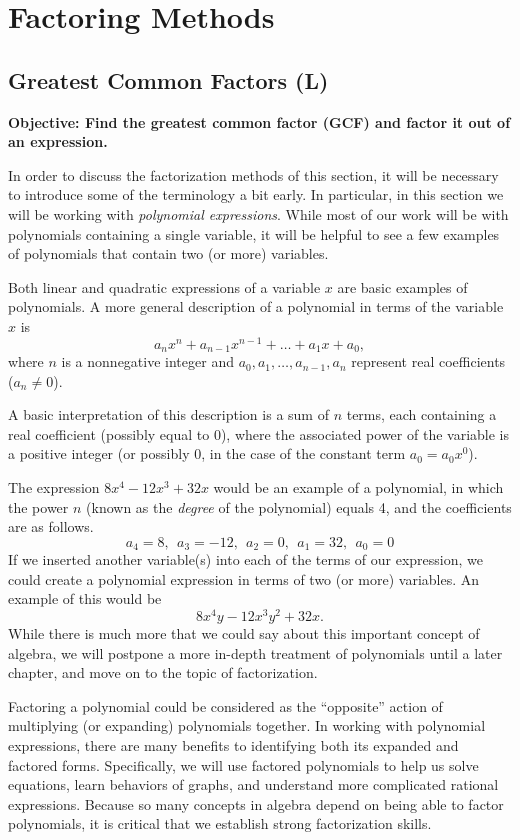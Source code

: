 \documentclass[12pt]{book}
\theoremstyle{definition}
\begin{document}
\section{Factoring Methods}
\subsection{Greatest Common Factors (L)}
{\bf Objective: Find the greatest common factor (GCF) and factor it out of an expression.}\par
In order to discuss the factorization methods of this section, it will be necessary to introduce some of the terminology a bit early.  In particular, in this section we will be working with {\it polynomial expressions}.  While most of our work will be with polynomials containing a single variable, it will be helpful to see a few examples of polynomials that contain two (or more) variables.\par
Both linear and quadratic expressions of a variable $x$ are basic examples of polynomials.  A more general description of a polynomial in terms of the variable $x$ is
$$a_nx^n+a_{n-1}x^{n-1}+\ldots+a_1x+a_0,$$
where $n$ is a nonnegative integer and $a_0,a_1,\ldots,a_{n-1},a_n$ represent real coefficients ($a_n\neq 0$).\par
A basic interpretation of this description is a sum of $n$ terms, each containing a real coefficient (possibly equal to 0), where the associated power of the variable is a positive integer (or possibly 0, in the case of the constant term $a_0=a_0x^0$).\par
The expression $8 x^4 - 12 x^3 + 32 x$ would be an example of a polynomial, in which the power $n$ (known as the {\it degree} of the polynomial) equals 4, and the coefficients are as follows.
$$a_4=8,~~a_3=-12,~~a_2=0,~~a_1=32,~~a_0=0$$
If we inserted another variable(s) into each of the terms of our expression, we could create a polynomial expression in terms of two (or more) variables.  An example of this would be $$8 x^4y - 12 x^3y^2 + 32 x.$$
While there is much more that we could say about this important concept of algebra, we will postpone a more in-depth treatment of polynomials until a later chapter, and move on to the topic of factorization.\par 
Factoring a polynomial could be considered as the ``opposite'' action of multiplying (or expanding) polynomials together.
In working with polynomial expressions, there are many benefits to identifying both its expanded and factored forms.  Specifically, we will use factored polynomials to help us solve equations, learn behaviors of graphs, and understand more complicated rational expressions.  Because so many concepts in algebra depend on being able to factor polynomials, it is critical that we establish strong factorization skills.\par
\end{document}
